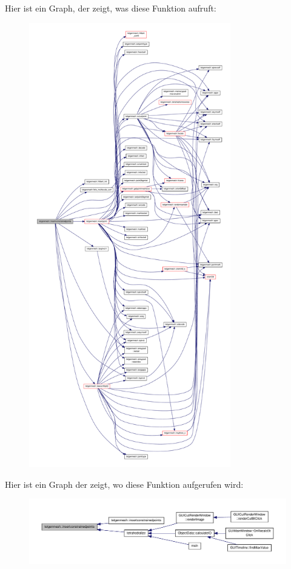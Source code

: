 Hier ist ein Graph, der zeigt, was diese Funktion aufruft\-:\nopagebreak
\begin{figure}[H]
\begin{center}
\leavevmode
\includegraphics[height=550pt]{classtetgenmesh_ac8205cae8e16f490b80d74975934ff74_cgraph}
\end{center}
\end{figure}




Hier ist ein Graph der zeigt, wo diese Funktion aufgerufen wird\-:\nopagebreak
\begin{figure}[H]
\begin{center}
\leavevmode
\includegraphics[width=350pt]{classtetgenmesh_ac8205cae8e16f490b80d74975934ff74_icgraph}
\end{center}
\end{figure}



